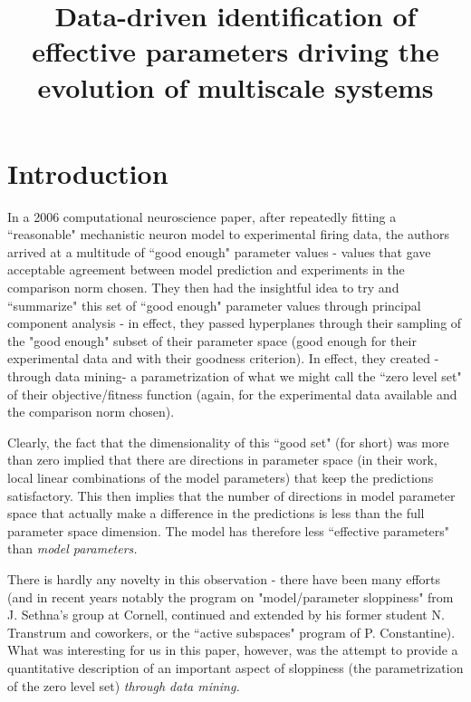 \documentclass{article}
\title{Data-driven identification of effective parameters
driving the evolution of multiscale systems}
\author{}
\begin{document}
\maketitle

\section{Introduction}

In a 2006 computational neuroscience paper, after repeatedly fitting a ``reasonable" mechanistic neuron model to experimental firing data, the authors arrived at a multitude of ``good enough" parameter values - values that gave acceptable agreement between model prediction and experiments in the comparison norm chosen. They then had the insightful idea to try and ``summarize" this set of ``good enough" parameter values through principal component analysis - in effect, they passed hyperplanes through their sampling of the "good enough" subset of their parameter space (good enough
for their experimental data and with their goodness criterion).
%
In effect, they created -through data mining- a parametrization of what we might call the ``zero level set" of their objective/fitness function (again, for the experimental data available and the comparison norm chosen).

Clearly, the fact that the dimensionality of this ``good set" (for short) was more than zero implied that there are
directions in parameter space (in their work, local linear combinations of the model parameters) that keep the
predictions satisfactory.
%
This then implies that the number of directions in model parameter space that actually make a difference in the predictions is less than the full parameter space dimension.
%
The model has therefore less ``effective parameters" than \em{model parameters}.

There is hardly any novelty in this observation - there have been many efforts (and in recent years notably the program on "model/parameter sloppiness" from J. Sethna's group at Cornell, continued and extended by his former student
N. Transtrum and coworkers, or the ``active subspaces" program of P. Constantine).
%
What was interesting for us in this paper, however, was the attempt to provide a quantitative description of an important aspect of sloppiness (the parametrization of the zero level set) \em{through data mining}.
\end{document}
